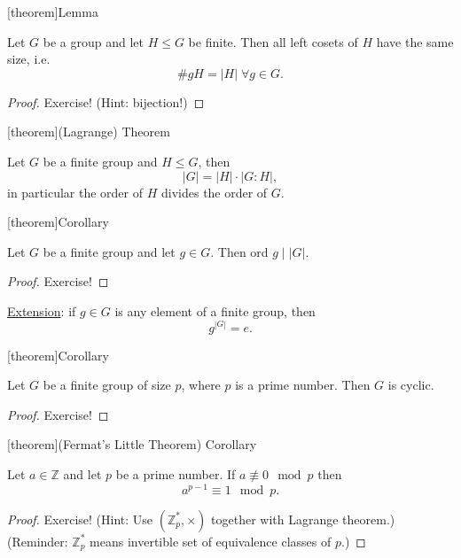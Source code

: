 \documentclass[12pt]{report}
\theoremstyle{definition}
\begin{document}
[theorem]{Lemma}
\begin{size of left coset}
    Let $G$ be a group and let $H \le G$ be finite.
    Then all left cosets of $H$ have the same size, i.e.\ \[
        \#gH = |H| \;\forall g \in G.
    \]
\end{size of left coset}

\begin{proof}
    Exercise! (Hint: bijection!)
\end{proof}

[theorem]{(Lagrange) Theorem}
\begin{Lagrange Theorem}
    Let $G$ be a finite group and $H \le G$, then\[
    |G| = |H| \cdot |G:H|,
    \]
    in particular the order of $H$ divides the order of $G$.
\end{Lagrange Theorem}

[theorem]{Corollary}
\begin{order of g divides order of G}
    Let $G$ be a finite group and let $g \in G$. Then ord $g \; | \; |G| $.
\end{order of g divides order of G}

\begin{proof}
    Exercise!
\end{proof}

\underline{Extension}: if $g \in G$ is any element of a finite group, then\[
    g^{|G|} = e.
\]

[theorem]{Corollary}
\begin{cyclic G}
    Let $G$ be a finite group of size $p$, where $p$ is a prime number.
    Then $G$ is cyclic.
\end{cyclic G}

\begin{proof}
    Exercise!
\end{proof}

[theorem]{(Fermat's Little Theorem) Corollary}
\begin{Fermat's Little Theorem}
    Let $a \in \mathbb{Z}$ and let $p$ be a prime number.
    If $a \not\equiv 0 \mod p$ then\[
        a^{p - 1} \equiv 1 \mod p.
    \]
\end{Fermat's Little Theorem}

\begin{proof}
    Exercise! (Hint: Use $(\mathbb{Z}_p^{*}, \times)$ together with Lagrange theorem.)
    (Reminder: $\mathbb{Z}^{*}_p$ means invertible set of equivalence classes of $p$.)
\end{proof}
\end{document}
